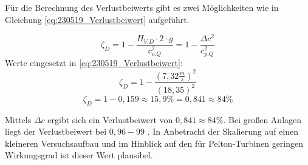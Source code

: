 Für die Berechnung des Verlustbeiwerts gibt es zwei Möglichkeiten wie in Gleichung \autoref{eq:230519_Verlustbeiwert} aufgeführt.

\begin{equation}
\zeta_D =1 - \frac{H_{V.D} \cdot 2 \cdot g}{c_{o.Q}^2}= 1 - \frac{\Delta c^2}{c_{p.Q}^2}
\label{eq:230519_Verlustbeiwert}
\end{equation}
Werte eingesetzt in \autoref{eq:230519_Verlustbeiwert}:
$$\zeta_{D} = 1 - \frac{(7,32\frac{m}{s})^2}{(18,35)^2}$$
$$ \zeta_{D} = 1 - 0,159 \approx 15,9\% = 0,841 \approx 84\% $$

Mittels $\Delta c$ ergibt sich ein Verlustbeiwert von $0,841 \approx 84\%$.
Bei großen Anlagen liegt der Verlustbeiwert bei $0,96-99$ \cite[S.32]{TUMUC}. 
In Anbetracht der Skalierung auf einen kleineren Versuchsaufbau und im Hinblick auf den für Pelton-Turbinen geringen Wirkungsgrad ist dieser Wert plausibel.